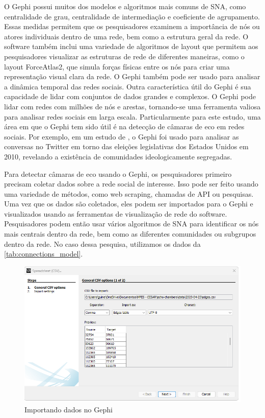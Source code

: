 O Gephi possui muitos dos modelos e algoritmos mais comuns de SNA, como centralidade de grau, centralidade de intermediação e coeficiente de agrupamento. Essas medidas permitem que os pesquisadores examinem a importância de nós ou atores individuais dentro de uma rede, bem como a estrutura geral da rede. O software também inclui uma variedade de algoritmos de layout que permitem aos pesquisadores visualizar as estruturas de rede de diferentes maneiras, como o layout ForceAtlas2, que simula forças físicas entre os nós para criar uma representação visual clara da rede. O Gephi também pode ser usado para analisar a dinâmica temporal das redes sociais. Outra característica útil do Gephi é sua capacidade de lidar com conjuntos de dados grandes e complexos. O Gephi pode lidar com redes com milhões de nós e arestas, tornando-se uma ferramenta valiosa para analisar redes sociais em larga escala. Particularmente para este estudo, uma área em que o Gephi tem sido útil é na detecção de câmaras de eco em redes sociais. Por exemplo, em um estudo de , o Gephi foi usado para analisar as conversas no Twitter em torno das eleições legislativas dos Estados Unidos em 2010, revelando a existência de comunidades ideologicamente segregadas.

Para detectar câmaras de eco usando o Gephi, os pesquisadores primeiro precisam coletar dados sobre a rede social de interesse. Isso pode ser feito usando uma variedade de métodos, como web scraping, chamadas de API ou pesquisas. Uma vez que os dados são coletados, eles podem ser importados para o Gephi e visualizados usando as ferramentas de visualização de rede do software. Pesquisadores podem então usar vários algoritmos de SNA para identificar os nós mais centrais dentro da rede, bem como as diferentes comunidades ou subgrupos dentro da rede. No caso dessa pesquisa, utilizamos os dados da \autoref{tab:connections_model}.

\begin{figure}[!htb]
	\caption{Importando dados no Gephi}
	\label{fig:gephi_edge_import}
	\centering
	\includegraphics[scale=0.6]{images/gephi-edge-import.png}
\end{figure}

